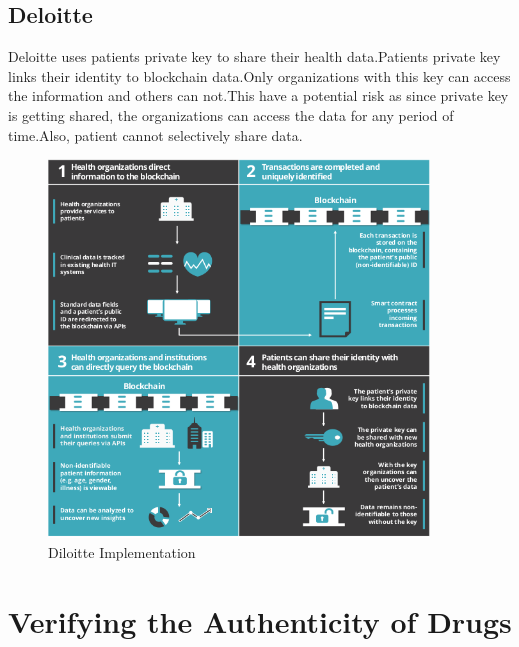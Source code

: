 \documentclass[12pt]{report}
\begin{document}
\subsection{Deloitte\cite{1}}
Deloitte uses patients private key to share their health data.Patients private key links their identity to blockchain data.Only organizations with this key can access the information and others can not.This have a potential risk as since private key is getting shared, the organizations can access the data for any period of time.Also, patient cannot selectively share data.
\begin{figure}[H]
\centering
\includegraphics[width=0.9\textwidth]{diloitte.png}
\caption{Diloitte Implementation}
\label{diloitte}
\end{figure}

\section{Verifying the Authenticity of Drugs}
\end{document}
